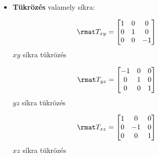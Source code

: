\documentclass[a4paper, 12pt]{scrartcl}
\begin{document}
\begin{blueBox}
\begin{itemize}
\begin{multicols}{3}
            $$
              \rmat T_y = \begin{bmatrix}
                0 & 0 & 0 \\
                0 & 1 & 0 \\
                0 & 0 & 0
              \end{bmatrix}
              \phantom{= \rmat T_y}
            $$
            $y$-tengelyre vetítés

            $$
              \rmat T_z = \begin{bmatrix}
                0 & 0 & 0 \\
                0 & 0 & 0 \\
                0 & 0 & 1
              \end{bmatrix}
              \phantom{= \rmat T_z}
            $$
            $z$-tengelyre vetítés
          \end{multicols}
          \vspace{-3mm}

    \item \textbf{Tükrözés} valamely síkra:
          \vspace{-11mm}
          \begin{multicols}{3}
            \centering
            $$
              \rmat T_{xy} = \begin{bmatrix}
                1 & 0 & 0  \\
                0 & 1 & 0  \\
                0 & 0 & -1
              \end{bmatrix}
              \phantom{= \rmat T_{xy}}
            $$
            $xy$ síkra tükrözés

            $$
              \rmat T_{yz} = \begin{bmatrix}
                -1 & 0 & 0 \\
                0  & 1 & 0 \\
                0  & 0 & 1
              \end{bmatrix}
              \phantom{= \rmat T_{yz}}
            $$
            $yz$ síkra tükrözés

            $$
              \rmat T_{xz} = \begin{bmatrix}
                1 & 0  & 0 \\
                0 & -1 & 0 \\
                0 & 0  & 1
              \end{bmatrix}
              \phantom{= \rmat T_{xz}}
            $$
            $xz$ síkra tükrözés
          \end{multicols}
          \vspace{-3mm}


\end{itemize}
\end{blueBox}
\end{document}
